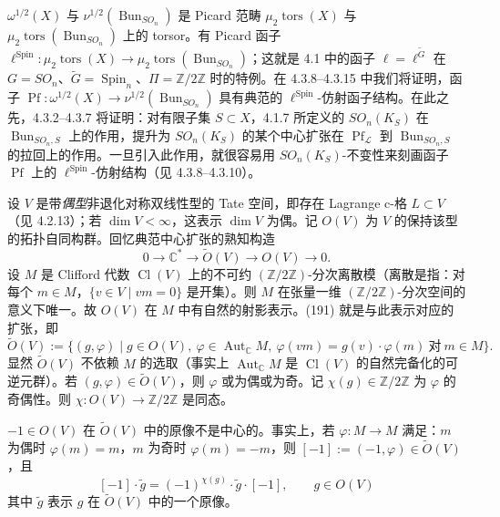 $\omega^{1/2}(X)$ 与 $\nu^{1/2}(\operatorname{Bun}_{SO_{n}})$ 是 Picard 范畴 $\mu_{2}\operatorname{tors}(X)$ 与 $\mu_{2}\operatorname{tors}(\operatorname{Bun}_{SO_{n}})$ 上的 torsor。有 Picard 函子 $\ell^{\operatorname{Spin}}:\mu_{2}\operatorname{tors}(X)\to\mu_{2}\operatorname{tors}(\operatorname{Bun}_{SO_{n}})$；这就是 4.1 中的函子 $\ell=\ell^{\tilde{G}}$ 在 $G=SO_{n}$、$\tilde{G}=\operatorname{Spin}_{n}$、$\Pi=\mathbb{Z}/2\mathbb{Z}$ 时的特例。在 4.3.8–4.3.15 中我们将证明，函子 $\operatorname{Pf}:\omega^{1/2}(X)\to\nu^{1/2}(\operatorname{Bun}_{SO_{n}})$ 具有典范的 $\ell^{\operatorname{Spin}}$-仿射函子结构。在此之先，4.3.2–4.3.7 将证明：对有限子集 $S\subset X$，4.1.7 所定义的 $SO_{n}(K_{S})$ 在 $\operatorname{Bun}_{SO_{n},S}$ 上的作用，提升为 $SO_{n}(K_{S})$ 的某个中心扩张在 $\operatorname{Pf}_{\mathcal{L}}$ 到 $\operatorname{Bun}_{SO_{n},S}$ 的拉回上的作用。一旦引入此作用，就很容易用 $SO_{n}(K_{S})$-不变性来刻画函子 $\operatorname{Pf}$ 上的 $\ell^{\operatorname{Spin}}$-仿射结构（见 4.3.8–4.3.10）。

 设 $V$ 是带\emph{偶型}非退化对称双线性型的 Tate 空间，即存在 Lagrange c-格 $L\subset V$（见 4.2.13）；若 $\dim V<\infty$，这表示 $\dim V$ 为偶。记 $O(V)$ 为 $V$ 的保持该型的拓扑自同构群。回忆典范中心扩张的熟知构造
\begin{equation}\tag{191}
0\to\mathbb{C}^{*}\to\tilde{O}(V)\to O(V)\to 0.
\end{equation}
设 $M$ 是 Clifford 代数 $\operatorname{Cl}(V)$ 上的不可约 $(\mathbb{Z}/2\mathbb{Z})$-分次离散模（离散是指：对每个 $m\in M$，$\{v\in V\mid vm=0\}$ 是开集）。则 $M$ 在张量一维 $(\mathbb{Z}/2\mathbb{Z})$-分次空间的意义下唯一。故 $O(V)$ 在 $M$ 中有自然的射影表示。(191) 就是与此表示对应的扩张，即
\[
\tilde{O}(V):=\{(g,\varphi)\mid g\in O(V),\ \varphi\in\operatorname{Aut}_{\mathbb{C}}M,\ \varphi(vm)=g(v)\cdot\varphi(m)\ \text{对}\ m\in M\}.
\]
显然 $\tilde{O}(V)$ 不依赖 $M$ 的选取（事实上 $\operatorname{Aut}_{\mathbb{C}}M$ 是 $\operatorname{Cl}(V)$ 的自然完备化的可逆元群）。若 $(g,\varphi)\in\tilde{O}(V)$，则 $\varphi$ 或为偶或为奇。记 $\chi(g)\in\mathbb{Z}/2\mathbb{Z}$ 为 $\varphi$ 的奇偶性。则 $\chi:O(V)\to\mathbb{Z}/2\mathbb{Z}$ 是同态。

$-1\in O(V)$ 在 $\tilde{O}(V)$ 中的原像不是中心的。事实上，若 $\varphi:M\to M$ 满足：$m$ 为偶时 $\varphi(m)=m$，$m$ 为奇时 $\varphi(m)=-m$，则 $[-1]:=(-1,\varphi)\in\tilde{O}(V)$，且
\begin{equation}\tag{192}
[-1]\cdot\tilde{g}=(-1)^{\chi(g)}\cdot\tilde{g}\cdot[-1],\qquad g\in O(V)
\end{equation}
其中 $\tilde{g}$ 表示 $g$ 在 $\tilde{O}(V)$ 中的一个原像。


